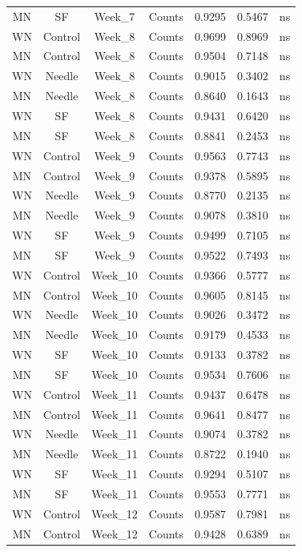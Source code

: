 \documentclass[
  12pt,
  letterpaper,
]{article}
\begin{document}
\begin{longtable}{ccclrrl}
MN & SF & Week\_7 & Counts & 0.9295 & 0.5467 & ns \\ 
WN & Control & Week\_8 & Counts & 0.9699 & 0.8969 & ns \\ 
MN & Control & Week\_8 & Counts & 0.9504 & 0.7148 & ns \\ 
WN & Needle & Week\_8 & Counts & 0.9015 & 0.3402 & ns \\ 
MN & Needle & Week\_8 & Counts & 0.8640 & 0.1643 & ns \\ 
WN & SF & Week\_8 & Counts & 0.9431 & 0.6420 & ns \\ 
MN & SF & Week\_8 & Counts & 0.8841 & 0.2453 & ns \\ 
WN & Control & Week\_9 & Counts & 0.9563 & 0.7743 & ns \\ 
MN & Control & Week\_9 & Counts & 0.9378 & 0.5895 & ns \\ 
WN & Needle & Week\_9 & Counts & 0.8770 & 0.2135 & ns \\ 
MN & Needle & Week\_9 & Counts & 0.9078 & 0.3810 & ns \\ 
WN & SF & Week\_9 & Counts & 0.9499 & 0.7105 & ns \\ 
MN & SF & Week\_9 & Counts & 0.9522 & 0.7493 & ns \\ 
WN & Control & Week\_10 & Counts & 0.9366 & 0.5777 & ns \\ 
MN & Control & Week\_10 & Counts & 0.9605 & 0.8145 & ns \\ 
WN & Needle & Week\_10 & Counts & 0.9026 & 0.3472 & ns \\ 
MN & Needle & Week\_10 & Counts & 0.9179 & 0.4533 & ns \\ 
WN & SF & Week\_10 & Counts & 0.9133 & 0.3782 & ns \\ 
MN & SF & Week\_10 & Counts & 0.9534 & 0.7606 & ns \\ 
WN & Control & Week\_11 & Counts & 0.9437 & 0.6478 & ns \\ 
MN & Control & Week\_11 & Counts & 0.9641 & 0.8477 & ns \\ 
WN & Needle & Week\_11 & Counts & 0.9074 & 0.3782 & ns \\ 
MN & Needle & Week\_11 & Counts & 0.8722 & 0.1940 & ns \\ 
WN & SF & Week\_11 & Counts & 0.9294 & 0.5107 & ns \\ 
MN & SF & Week\_11 & Counts & 0.9553 & 0.7771 & ns \\ 
WN & Control & Week\_12 & Counts & 0.9587 & 0.7981 & ns \\ 
MN & Control & Week\_12 & Counts & 0.9428 & 0.6389 & ns \\ 

\end{longtable}
\end{document}
